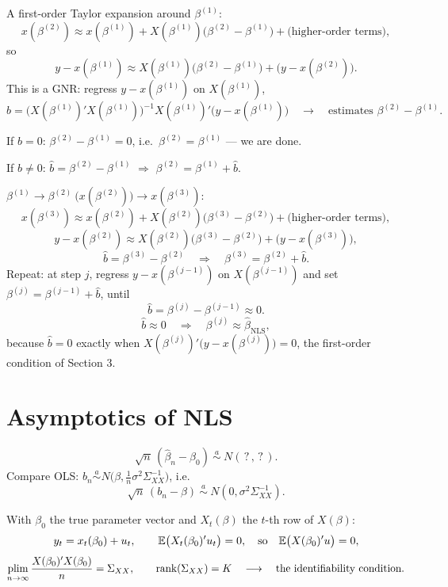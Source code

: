 \documentclass[11pt]{article}
\begin{document}
A first-order Taylor expansion around $\beta^{(1)}$:
\[ x(\beta^{(2)}) \approx x(\beta^{(1)}) + X(\beta^{(1)})\bigl(\beta^{(2)} - \beta^{(1)}\bigr)
   + \text{(higher-order terms)}, \]
so
\[ y - x(\beta^{(1)}) \approx X(\beta^{(1)})\bigl(\beta^{(2)} - \beta^{(1)}\bigr) + \bigl(y - x(\beta^{(2)})\bigr). \]
This is a GNR: regress $y - x(\beta^{(1)})$ on $X(\beta^{(1)})$,
\[ \hat b = \bigl(X(\beta^{(1)})'X(\beta^{(1)})\bigr)^{-1}X(\beta^{(1)})'\bigl(y - x(\beta^{(1)})\bigr)
   \quad\longrightarrow\quad \text{estimates } \beta^{(2)} - \beta^{(1)}. \]
\begin{flatlist}
  \item If $\hat b = 0$: $\beta^{(2)} - \beta^{(1)} = 0$, i.e.\ $\beta^{(2)} = \beta^{(1)}$ --- we are done.
  \item If $\hat b \neq 0$: $\hat b = \beta^{(2)} - \beta^{(1)}$ $\Longrightarrow$
        $\beta^{(2)} = \beta^{(1)} + \hat b$.
\end{flatlist}

$\beta^{(1)} \to \beta^{(2)}\ \bigl(x(\beta^{(2)})\bigr) \to x(\beta^{(3)})$:
\[ x(\beta^{(3)}) \approx x(\beta^{(2)}) + X(\beta^{(2)})\bigl(\beta^{(3)} - \beta^{(2)}\bigr) + \text{(higher-order terms)}, \]
\[ y - x(\beta^{(2)}) \approx X(\beta^{(2)})\bigl(\beta^{(3)} - \beta^{(2)}\bigr) + \bigl(y - x(\beta^{(3)})\bigr), \]
\[ \hat b = \beta^{(3)} - \beta^{(2)} \quad\Longrightarrow\quad \boxed{\beta^{(3)} = \beta^{(2)} + \hat b}. \]
Repeat: at step $j$, regress $y - x(\beta^{(j-1)})$ on $X(\beta^{(j-1)})$ and set
$\beta^{(j)} = \beta^{(j-1)} + \hat b$, until
\[ \hat b = \beta^{(j)} - \beta^{(j-1)} \approx 0. \]
\[ \hat b \approx 0 \quad\Longrightarrow\quad \beta^{(j)} \approx \hat\beta_{\text{NLS}}, \]
because $\hat b = 0$ exactly when $X(\beta^{(j)})'\bigl(y - x(\beta^{(j)})\bigr) = 0$, the
first-order condition of Section 3.


\section{Asymptotics of NLS}

\[ \sqrt{n}\,(\hat\beta_{n} - \beta_{0}) \ \overset{a}{\sim}\ N(\,?\,, \,?\,). \]
Compare OLS: $b_{n} \overset{a}{\sim} N\bigl(\beta, \tfrac{1}{n}\sigma^{2}\Sigma_{XX}^{-1}\bigr)$, i.e.
\[ \sqrt{n}\,(b_{n} - \beta) \ \overset{a}{\sim}\ N(0, \sigma^{2}\Sigma_{XX}^{-1}). \]

With $\beta_{0}$ the true parameter vector and $X_{t}(\beta)$ the $t$-th row of $X(\beta)$:
\[ y_{t} = x_{t}(\beta_{0}) + u_{t}, \qquad
   \mathbb{E}\bigl(X_{t}(\beta_{0})'u_{t}\bigr) = 0, \quad\text{so}\quad
   \mathbb{E}\bigl(X(\beta_{0})'u\bigr) = 0, \]
\[ \operatorname*{plim}_{n\to\infty}\frac{X(\beta_{0})'X(\beta_{0})}{n} = \Sigma_{XX},
   \qquad \operatorname{rank}(\Sigma_{XX}) = K
   \quad\longrightarrow\quad \text{the identifiability condition.} \]
\end{document}
